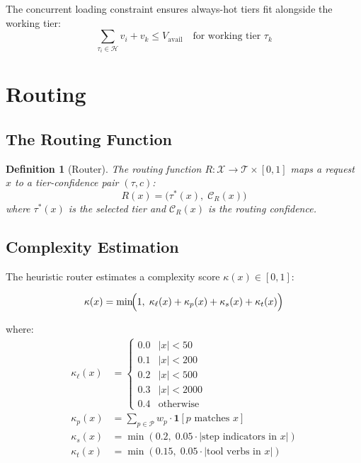 \documentclass[11pt, a4paper, twocolumn]{article}
\newcommand{\conf}{\mathcal{C}}
\newtheorem{definition}{Definition}
\begin{document}
The concurrent loading constraint ensures always-hot tiers fit alongside the working tier:
\begin{equation}
    \sum_{\tau_i \in \mathcal{H}} v_i + v_k \leq V_{\text{avail}} \quad \text{for working tier } \tau_k
\end{equation}

\section{Routing}

\subsection{The Routing Function}

\begin{definition}[Router]
The routing function $R: \mathcal{X} \to \mathcal{T} \times [0,1]$ maps a request $x$ to a tier-confidence pair $(\tau, c)$:
\begin{equation}
    R(x) = \bigl(\tau^*(x),\; \conf_R(x)\bigr)
\end{equation}
where $\tau^*(x)$ is the selected tier and $\conf_R(x)$ is the routing confidence.
\end{definition}

\subsection{Complexity Estimation}

The heuristic router estimates a complexity score $\kappa(x) \in [0, 1]$:

\begin{equation}
    \kappa(x) = \min\!\Bigl(1,\; \kappa_{\ell}(x) + \kappa_{p}(x) + \kappa_{s}(x) + \kappa_{t}(x)\Bigr)
\end{equation}

where:
\begin{align}
    \kappa_{\ell}(x) &= \begin{cases}
        0.0 & |x| < 50 \\
        0.1 & |x| < 200 \\
        0.2 & |x| < 500 \\
        0.3 & |x| < 2000 \\
        0.4 & \text{otherwise}
    \end{cases} \\[4pt]
    \kappa_{p}(x) &= \sum_{p \in \mathcal{P}} w_p \cdot \mathbf{1}[p \text{ matches } x] \\[4pt]
    \kappa_{s}(x) &= \min(0.2,\; 0.05 \cdot |\text{step indicators in } x|) \\[4pt]
    \kappa_{t}(x) &= \min(0.15,\; 0.05 \cdot |\text{tool verbs in } x|)
\end{align}
\end{document}
